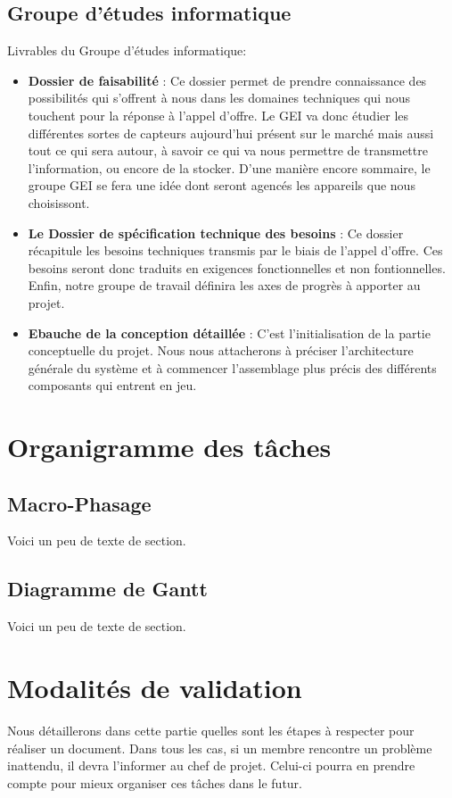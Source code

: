     \subsection{Groupe d'études informatique}
Livrables du Groupe d'études informatique:   
\begin{itemize}
\item \textbf{Dossier de faisabilité} : Ce dossier permet de prendre connaissance des possibilités qui s'offrent à nous dans les domaines techniques qui nous touchent pour la réponse à l'appel d'offre. Le GEI va donc étudier les différentes sortes de capteurs aujourd'hui présent sur le marché mais aussi tout ce qui sera autour, à savoir ce qui va nous permettre de transmettre l'information, ou encore de la stocker. D'une manière encore sommaire, le groupe GEI se fera une idée dont seront agencés les appareils que nous choisissont.
\item \textbf{Le Dossier de spécification technique des besoins} : Ce dossier récapitule les besoins techniques transmis par le biais de l'appel d'offre. Ces besoins seront donc traduits en exigences fonctionnelles et non fontionnelles. Enfin, notre groupe de travail définira les axes de progrès à apporter au projet.
\item \textbf{Ebauche de la conception détaillée} :  C'est l'initialisation de la partie conceptuelle du projet. Nous nous attacherons à préciser l'architecture générale du système et à commencer l'assemblage plus précis des différents composants qui entrent en jeu.
\end{itemize}
    
    \section{Organigramme des tâches}
    \subsection{Macro-Phasage}
    Voici un peu de texte de section.
    \subsection{Diagramme de Gantt}
    Voici un peu de texte de section.
    
    \section{Modalités de validation}
Nous détaillerons dans cette partie quelles sont les étapes à respecter pour réaliser un document. Dans tous les cas, si un membre rencontre un problème inattendu, il devra l’informer au chef de projet. Celui-ci pourra en prendre compte pour mieux organiser ces tâches dans le futur.
